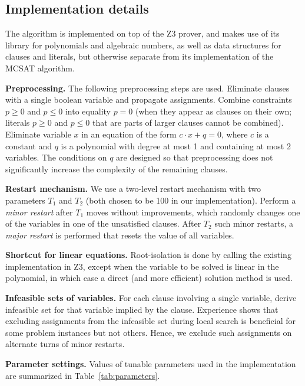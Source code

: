 \documentclass[runningheads]{llncs}
\begin{document}
\subsection{Implementation details}
\label{sec:implementation-details}

The algorithm is implemented on top of the Z3 prover, and makes use of its library for polynomials and algebraic numbers, as well as data structures for clauses and literals, but otherwise separate from its implementation of the MCSAT algorithm.

\textbf{Preprocessing.} The following preprocessing steps are used. Eliminate clauses with a single boolean variable and propagate assignments. Combine constraints $p\ge 0$ and $p\le 0$ into equality $p=0$ (when they appear as clauses on their own; literals $p\ge 0$ and $p\le 0$ that are parts of larger clauses cannot be combined). Eliminate variable $x$ in an equation of the form $c\cdot x+q=0$, where $c$ is a constant and $q$ is a polynomial with degree at most 1 and containing at most 2 variables. The conditions on $q$ are designed so that preprocessing does not significantly increase the complexity of the remaining clauses.

\textbf{Restart mechanism.} We use a two-level restart mechanism with two parameters $T_1$ and $T_2$ (both chosen to be 100 in our implementation). Perform a \emph{minor restart} after $T_1$ moves without improvements, which randomly changes one of the variables in one of the unsatisfied clauses. After $T_2$ such minor restarts, a \emph{major restart} is performed that resets the value of all variables.

\textbf{Shortcut for linear equations.} Root-isolation is done by calling the existing implementation in Z3, except when the variable to be solved is linear in the polynomial, in which case a direct (and more efficient) solution method is used.

\textbf{Infeasible sets of variables.} For each clause involving a single variable, derive infeasible set for that variable implied by the clause. Experience shows that excluding assignments from the infeasible set during local search is beneficial for some problem instances but not others. Hence, we exclude such assignments on alternate turns of minor restarts.

\textbf{Parameter settings.} Values of tunable parameters used in the implementation are summarized in Table~\ref{tab:parameters}.
\end{document}
